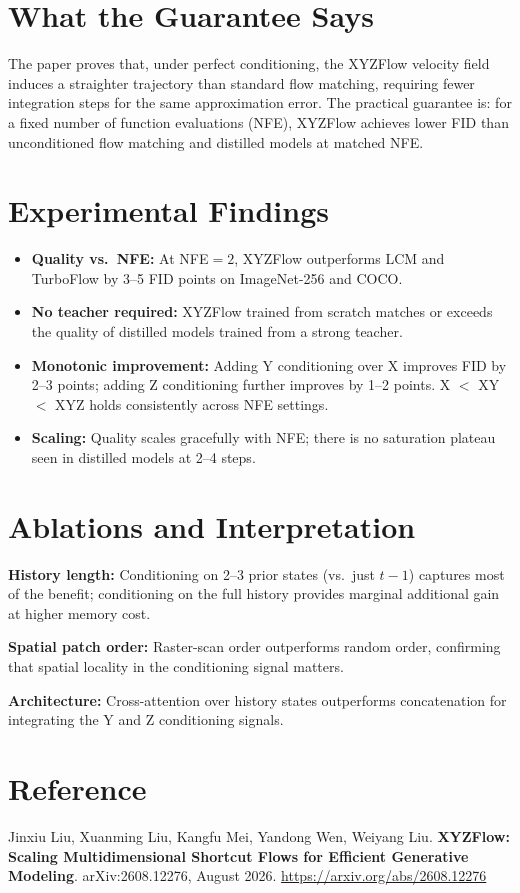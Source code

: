 \documentclass[10pt,twocolumn]{article}
\begin{document}
\section{What the Guarantee Says}

The paper proves that, under perfect conditioning, the XYZFlow velocity field
induces a straighter trajectory than standard flow matching, requiring fewer
integration steps for the same approximation error. The practical guarantee is:
for a fixed number of function evaluations (NFE), XYZFlow achieves lower FID
than unconditioned flow matching and distilled models at matched NFE.

\section{Experimental Findings}

\begin{itemize}[itemsep=2pt,parsep=0pt]
  \item \textbf{Quality vs.\ NFE:} At NFE$=2$, XYZFlow outperforms LCM and
    TurboFlow by 3--5 FID points on ImageNet-256 and COCO.
  \item \textbf{No teacher required:} XYZFlow trained from scratch matches
    or exceeds the quality of distilled models trained from a strong teacher.
  \item \textbf{Monotonic improvement:} Adding Y conditioning over X improves
    FID by 2--3 points; adding Z conditioning further improves by 1--2 points.
    X $<$ XY $<$ XYZ holds consistently across NFE settings.
  \item \textbf{Scaling:} Quality scales gracefully with NFE; there is no
    saturation plateau seen in distilled models at 2--4 steps.
\end{itemize}

\section{Ablations and Interpretation}

\textbf{History length:} Conditioning on 2--3 prior states (vs.\ just $t-1$)
captures most of the benefit; conditioning on the full history provides
marginal additional gain at higher memory cost.

\textbf{Spatial patch order:} Raster-scan order outperforms random order,
confirming that spatial locality in the conditioning signal matters.

\textbf{Architecture:} Cross-attention over history states outperforms
concatenation for integrating the Y and Z conditioning signals.

\section*{Reference}

Jinxiu Liu, Xuanming Liu, Kangfu Mei, Yandong Wen, Weiyang Liu.
\textbf{XYZFlow: Scaling Multidimensional Shortcut Flows for Efficient Generative Modeling}.
arXiv:2608.12276, August 2026.
\url{https://arxiv.org/abs/2608.12276}
\end{document}
